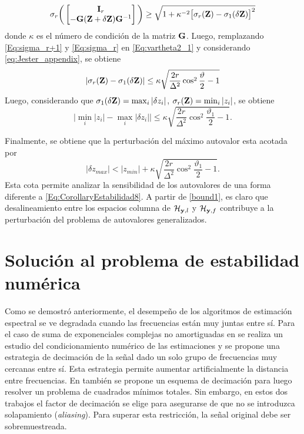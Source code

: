 	\begin{equation}
	\sigma_r\bigg(\begin{bmatrix} \mathbf{I}_r \\ -\mathbf{G}(\mathbf{Z}+\delta\mathbf{Z})\mathbf{G}^{-1}\end{bmatrix}\bigg)\ge \sqrt{1+\kappa^{-2}\big[\sigma_r(\mathbf{Z})-\sigma_1(\delta\mathbf{Z})\big]^2}
	\label{Eq:sigma_r}
	\end{equation}
	donde $\kappa$ es el número de condición de la matriz $\mathbf{G}$. Luego, remplazando \eqref{Eq:sigma_r+1} y \eqref{Eq:sigma_r} en \eqref{Eq:vartheta2_1} y considerando  \eqref{eq:Jester_appendix}, se obtiene
	\[|\sigma_r(\mathbf{Z})-\sigma_1(\delta\mathbf{Z})|\le \kappa\sqrt{\frac{2r}{\Delta^2}\cos^2\frac{\vartheta}{2}-1}\]
	Luego, considerando que $\sigma_1(\delta\mathbf{Z}) = \max_i|\delta z_i|$, $\sigma_r(\mathbf{Z}) = \min_i|z_i|$, se obtiene
	\[\big|\min_i|z_i|-\max_i|\delta z_i|\big|\le \kappa\sqrt{\frac{2r}{\Delta^2}\cos^2\frac{\vartheta_1}{2}-1}.\]
	
	Finalmente, se obtiene que la perturbación del máximo autovalor esta acotada por
	\begin{equation}
	|\delta z_{max}|<|z_{min}| + \kappa\sqrt{\frac{2r}{\Delta^2}\cos^2\frac{\vartheta_1}{2}-1}.
	\label{bound1}
	\end{equation}
	Esta cota permite analizar la sensibilidad de los autovalores de una forma diferente a \eqref{Eq:CorollaryEstabilidad8}. A partir de \eqref{bound1}, es claro que desalineamiento entre los espacios columna de $\mathcal{H}_{\mathbf{y},l}$ y $\mathcal{H}_{\mathbf{y},f}$ contribuye a la perturbación del problema de autovalores generalizados.
	

	\section{Solución al problema de estabilidad numérica} 
		
		Como se demostró anteriormente, el desempeño de los algoritmos de estimación espectral se ve degradada  cuando las frecuencias están muy juntas entre sí. Para el caso de suma de exponenciales complejas no amortiguadas en \cite{BATENKOV2018} se realiza un estudio del condicionamiento numérico de las estimaciones y se propone una estrategia de decimación de la señal dado un solo grupo de frecuencias muy cercanas entre sí. Esta estrategia permite aumentar artificialmente la distancia entre frecuencias. En \cite{Morren2003} también se propone un esquema de decimación para luego resolver un problema de cuadrados mínimos totales. Sin embargo, en estos dos trabajos el factor de decimación se elige para asegurarse de que no se introduzca solapamiento (\emph{aliasing}).  Para superar esta restricción, la señal original debe ser sobremuestreada.
		
